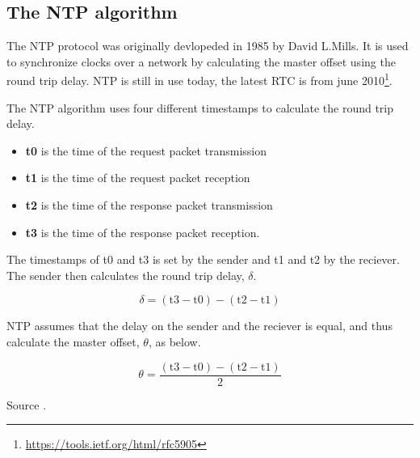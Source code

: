 \subsection{The NTP algorithm}
\label{sec:ntp}

The NTP protocol was originally devlopeded in 1985 by David L.Mills. It is used to synchronize clocks over a network by calculating the master offset using the round trip delay. NTP is still in use today, the latest RTC is from june 2010\footnote{\url{https://tools.ietf.org/html/rfc5905}}.

The NTP algorithm uses four different timestamps to calculate the round trip delay. 

\begin{itemize}
  \item[] \textbf{t0} is the time of the request packet transmission
  \item[] \textbf{t1} is the time of the request packet reception
  \item[] \textbf{t2} is the time of the response packet transmission
  \item[] \textbf{t3} is the time of the response packet reception.
\end{itemize}
\label{fig:ntpvars}

The timestamps of t0 and t3 is set by the sender and t1 and t2 by the reciever. The sender then calculates the round trip delay, $\delta$. 

\begin{displaymath}
	\delta = (\text{t3} - \text{t0}) - (\text{t2} - \text{t1})
\end{displaymath}
\label{fig:ntpdelta}

NTP assumes that the delay on the sender and the reciever is equal, and thus calculate the master offset, $\theta$,  as below. 

\begin{displaymath}
	\theta = \frac{(\text{t3} - \text{t0}) - (\text{t2} - \text{t1})}{2}
\end{displaymath}
\label{fig:ntpmo}

Source \cite{mills}.
